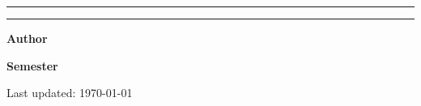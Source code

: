\begin{titlepage}
    \vspace{1.0cm}
    {\rule{\textwidth}{0.9pt}}

    \vspace{0.6cm}
    {\raggedright
        \large \color{v-ink!85}\Tagline\par
    }

    \vfill
    \vspace{1.1cm}
    {\rule{\textwidth}{0.9pt}}

    \noindent
    \begin{minipage}[t]{0.5\textwidth}
        \raggedright
        {\color{v-primary}\sffamily\bfseries Author}\par\vspace{0.25cm}
        {\Large \sffamily \AuthorName}\par
        \vspace{0.2cm}
        {\sffamily \small \href{mailto:\AuthorEmail}{\AuthorEmail}}
    \end{minipage}%
    \begin{minipage}[t]{0.5\textwidth}
        \raggedleft
        {\color{v-primary}\sffamily\bfseries Semester}\par\vspace{0.25cm}
        {\Large \sffamily \Semester}\par
        \vspace{0.2cm}
        {\sffamily \small Last updated: \today}
    \end{minipage}

\end{titlepage}